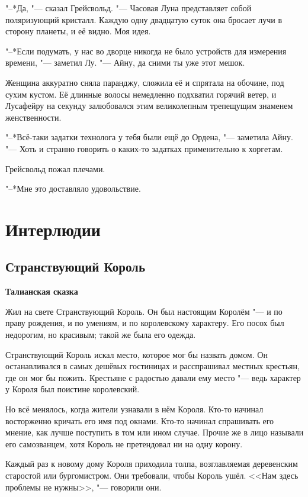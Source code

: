 "--*Да, "--- сказал Грейсвольд.
"--- Часовая Луна представляет собой поляризующий кристалл.
Каждую одну двадцатую суток она бросает лучи в сторону планеты, и её видно.
Моя идея.

"--*Если подумать, у нас во дворце никогда не было устройств для измерения времени, "--- заметил Лу.
"--- Айну, да сними ты уже этот мешок.

Женщина аккуратно сняла паранджу, сложила её и спрятала на обочине, под сухим кустом.
Её длинные волосы немедленно подхватил горячий ветер, и Лусафейру на секунду залюбовался этим великолепным трепещущим знаменем женственности.

"--*Всё-таки задатки технолога у тебя были ещё до Ордена, "--- заметила Айну.
"--- Хоть и странно говорить о каких-то задатках применительно к хоргетам.

Грейсвольд пожал плечами.

"--*Мне это доставляло удовольствие.

\chapter{Интерлюдии}

\section{Странствующий Король}

\textbf{Талианская сказка}

Жил на свете Странствующий Король.
Он был настоящим Королём "--- и по праву рождения, и по умениям, и по королевскому характеру.
Его посох был недорогим, но красивым;
такой же была его одежда.

Странствующий Король искал место, которое мог бы назвать домом.
Он останавливался в самых дешёвых гостиницах и расспрашивал местных крестьян, где он мог бы пожить.
Крестьяне с радостью давали ему место "--- ведь характер у Короля был поистине королевский.

Но всё менялось, когда жители узнавали в нём Короля.
Кто-то начинал восторженно кричать его имя под окнами.
Кто-то начинал спрашивать его мнение, как лучше поступить в том или ином случае.
Прочие же в лицо называли его самозванцем, хотя Король не претендовал ни на одну корону.

Каждый раз к новому дому Короля приходила толпа, возглавляемая деревенским старостой или бургомистром.
Они требовали, чтобы Король ушёл.
<<Нам здесь проблемы не нужны>>, "--- говорили они.


